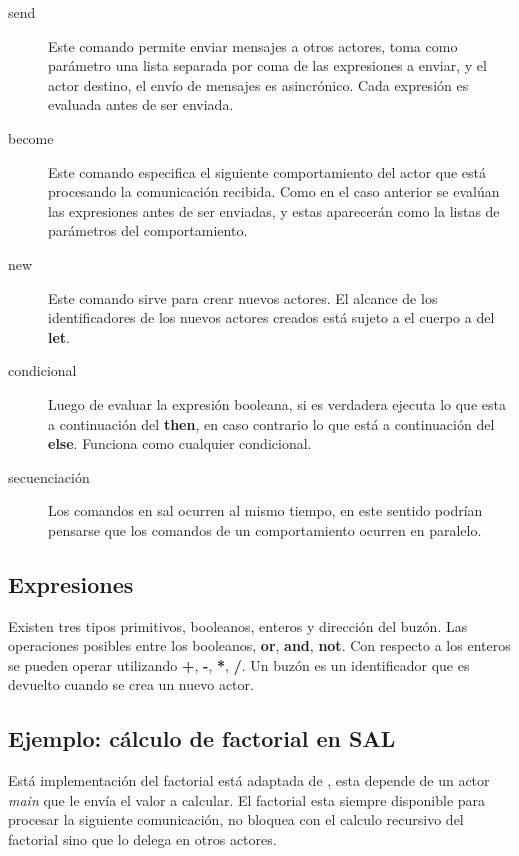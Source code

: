 \documentclass[fleqn]{article}
\begin{document}
\begin{description}
\item [send]  Este comando permite enviar mensajes a otros actores, toma como
  parámetro una lista separada por coma de las expresiones a enviar, y el actor
  destino, el envío de mensajes es asincrónico. Cada expresión es evaluada antes
  de ser enviada.
\item [become] Este comando especifica el siguiente comportamiento del actor
  que está procesando la comunicación recibida. Como en el caso anterior se evalúan
  las expresiones antes de ser enviadas, y estas aparecerán como la listas de
  parámetros del comportamiento. 
\item[new] Este comando sirve para crear nuevos actores. El alcance de los
  identificadores de los nuevos actores creados está sujeto a el cuerpo a del \textbf{let}.
\item[condicional] Luego de evaluar la expresión booleana, si es verdadera
  ejecuta lo que esta a continuación del \textbf{then}, en caso contrario lo que está a
  continuación del \textbf{else}. Funciona como cualquier condicional.
\item[secuenciación] Los comandos en sal ocurren al mismo tiempo, en este
  sentido podrían pensarse que los comandos de un comportamiento ocurren en paralelo.
  
\end{description}

\subsection{Expresiones}

Existen tres tipos primitivos, booleanos, enteros y dirección del buzón. Las operaciones
posibles entre los booleanos, \textbf{or}, \textbf{and}, \textbf{not}. Con
respecto a los enteros se pueden operar utilizando \textbf{+}, \textbf{-},
\textbf{*}, \textbf{/}. Un buzón es un identificador que es devuelto cuando se
crea un nuevo actor.

\subsection{Ejemplo: cálculo de factorial en SAL}

Está implementación del factorial está adaptada de \cite{Agha:1986:AMC:7929}, esta
depende de un actor \textit{main} que le envía el valor a calcular. El factorial
esta siempre disponible para procesar la siguiente comunicación, no bloquea con
el calculo recursivo del factorial sino que lo delega en otros actores.
\end{document}

